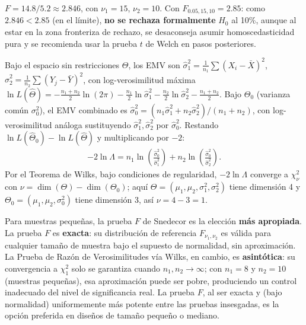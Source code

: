 \begin{solproblema}[prob:682c2b2]
	$F=14.8/5.2\approx2.846$, con $\nu_1=15$, $\nu_2=10$. Con $F_{0.05,15,10}=2.85$: como $2.846<2.85$ (en el límite), \textbf{no se rechaza formalmente} $H_0$ al 10\%, aunque al estar en la zona fronteriza de rechazo, se desaconseja asumir homoscedasticidad pura y se recomienda usar la prueba $t$ de Welch en pasos posteriores.
\end{solproblema}

\begin{solproblema}[prob:120019a]
	Bajo el espacio sin restricciones $\Theta$, los EMV son $\hat\sigma_1^2=\frac{1}{n_1}\sum(X_i-\bar X)^2$, $\hat\sigma_2^2=\frac{1}{n_2}\sum(Y_j-\bar Y)^2$, con log-verosimilitud máxima $\ln L(\hat\Theta) = -\frac{n_1+n_2}{2}\ln(2\pi)-\frac{n_1}{2}\ln\hat\sigma_1^2-\frac{n_2}{2}\ln\hat\sigma_2^2-\frac{n_1+n_2}{2}$. Bajo $\Theta_0$ (varianza común $\sigma_0^2$), el EMV combinado es $\hat\sigma_0^2=(n_1\hat\sigma_1^2+n_2\hat\sigma_2^2)/(n_1+n_2)$, con log-verosimilitud análoga sustituyendo $\hat\sigma_1^2,\hat\sigma_2^2$ por $\hat\sigma_0^2$. Restando $\ln L(\hat\Theta_0)-\ln L(\hat\Theta)$ y multiplicando por $-2$:
	\begin{align*}
		-2\ln\Lambda = n_1\ln\left(\frac{\hat\sigma_0^2}{\hat\sigma_1^2}\right)+n_2\ln\left(\frac{\hat\sigma_0^2}{\hat\sigma_2^2}\right).
	\end{align*}
	Por el Teorema de Wilks, bajo condiciones de regularidad, $-2\ln\Lambda$ converge a $\chi^2_\nu$ con $\nu=\dim(\Theta)-\dim(\Theta_0)$; aquí $\Theta=(\mu_1,\mu_2,\sigma_1^2,\sigma_2^2)$ tiene dimensión 4 y $\Theta_0=(\mu_1,\mu_2,\sigma_0^2)$ tiene dimensión 3, así $\nu=4-3=1$.
\end{solproblema}

\begin{solproblema}[prob:9db6e94]
	Para muestras pequeñas, la prueba $F$ de Snedecor es la elección \textbf{más apropiada}. La prueba $F$ es \textbf{exacta}: su distribución de referencia $F_{\nu_1,\nu_2}$ es válida para cualquier tamaño de muestra bajo el supuesto de normalidad, sin aproximación. La Prueba de Razón de Verosimilitudes vía Wilks, en cambio, es \textbf{asintótica}: su convergencia a $\chi^2_1$ solo se garantiza cuando $n_1,n_2\to\infty$; con $n_1=8$ y $n_2=10$ (muestras pequeñas), esa aproximación puede ser pobre, produciendo un control inadecuado del nivel de significancia real. La prueba $F$, al ser exacta y (bajo normalidad) uniformemente más potente entre las pruebas insesgadas, es la opción preferida en diseños de tamaño pequeño o mediano.
\end{solproblema}

